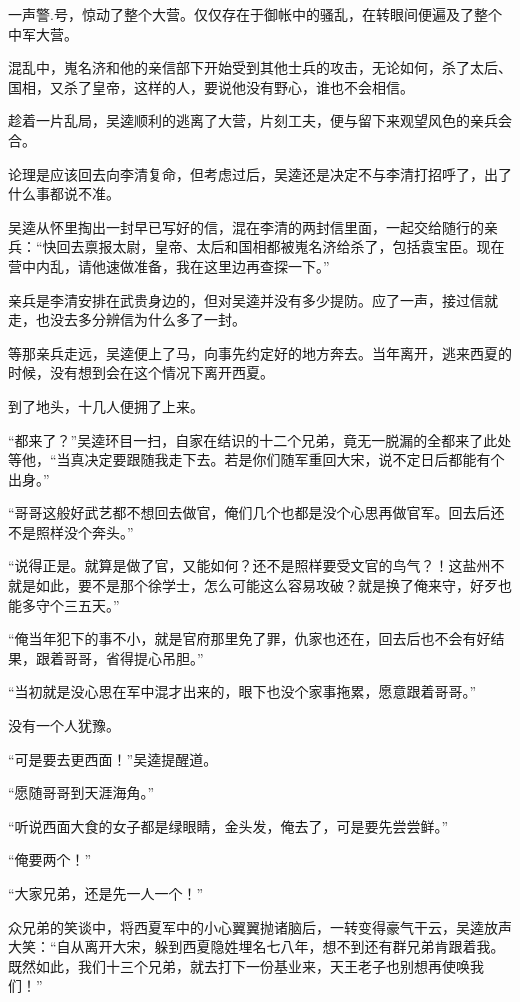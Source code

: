 一声警.号，惊动了整个大营。仅仅存在于御帐中的骚乱，在转眼间便遍及了整个中军大营。

混乱中，嵬名济和他的亲信部下开始受到其他士兵的攻击，无论如何，杀了太后、国相，又杀了皇帝，这样的人，要说他没有野心，谁也不会相信。

趁着一片乱局，吴逵顺利的逃离了大营，片刻工夫，便与留下来观望风色的亲兵会合。

论理是应该回去向李清复命，但考虑过后，吴逵还是决定不与李清打招呼了，出了什么事都说不准。

吴逵从怀里掏出一封早已写好的信，混在李清的两封信里面，一起交给随行的亲兵：“快回去禀报太尉，皇帝、太后和国相都被嵬名济给杀了，包括袁宝臣。现在营中内乱，请他速做准备，我在这里边再查探一下。”

亲兵是李清安排在武贵身边的，但对吴逵并没有多少提防。应了一声，接过信就走，也没去多分辨信为什么多了一封。

等那亲兵走远，吴逵便上了马，向事先约定好的地方奔去。当年离开，逃来西夏的时候，没有想到会在这个情况下离开西夏。

到了地头，十几人便拥了上来。

“都来了？”吴逵环目一扫，自家在结识的十二个兄弟，竟无一脱漏的全都来了此处等他，“当真决定要跟随我走下去。若是你们随军重回大宋，说不定日后都能有个出身。”

“哥哥这般好武艺都不想回去做官，俺们几个也都是没个心思再做官军。回去后还不是照样没个奔头。”

“说得正是。就算是做了官，又能如何？还不是照样要受文官的鸟气？！这盐州不就是如此，要不是那个徐学士，怎么可能这么容易攻破？就是换了俺来守，好歹也能多守个三五天。”

“俺当年犯下的事不小，就是官府那里免了罪，仇家也还在，回去后也不会有好结果，跟着哥哥，省得提心吊胆。”

“当初就是没心思在军中混才出来的，眼下也没个家事拖累，愿意跟着哥哥。”

没有一个人犹豫。

“可是要去更西面！”吴逵提醒道。

“愿随哥哥到天涯海角。”

“听说西面大食的女子都是绿眼睛，金头发，俺去了，可是要先尝尝鲜。”

“俺要两个！”

“大家兄弟，还是先一人一个！”

众兄弟的笑谈中，将西夏军中的小心翼翼抛诸脑后，一转变得豪气干云，吴逵放声大笑：“自从离开大宋，躲到西夏隐姓埋名七八年，想不到还有群兄弟肯跟着我。既然如此，我们十三个兄弟，就去打下一份基业来，天王老子也别想再使唤我们！”

